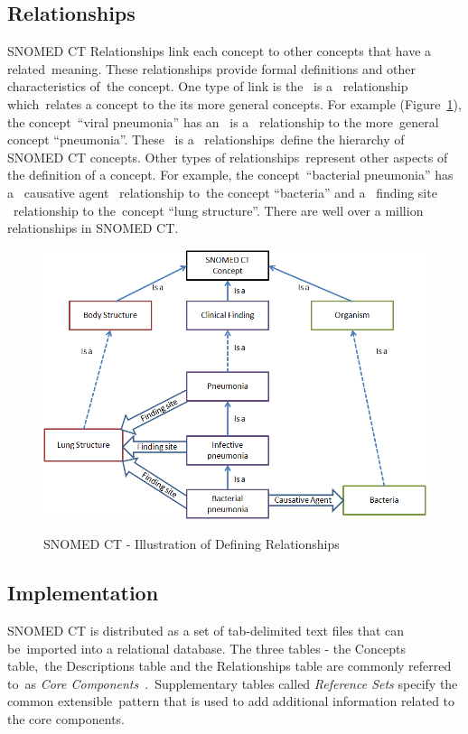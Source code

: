 \documentclass[DIV=calc, paper=a4, fontsize=12pt, onecolumn]{scrartcl}	 %
\begin{document}
  \subsection{Relationships}
  SNOMED CT Relationships link each concept to other concepts that have a related\
  meaning. These relationships provide formal definitions and other characteristics of\
  the concept. One type of link is the \textbar ~is a \textbar ~relationship which\
  relates a concept to the its more general concepts. For example (Figure~\ref{fig:snomedct_relationships}), the concept\
  ``viral pneumonia'' has an \textbar ~is a \textbar ~relationship to the more\
  general concept ``pneumonia''. These \textbar ~is a \textbar ~relationships\
  define the hierarchy of SNOMED CT concepts. Other types of relationships\
  represent other aspects of the definition of a concept. For example, the concept\
  ``bacterial pneumonia'' has a \textbar ~causative agent \textbar ~relationship to\
  the concept ``bacteria'' and a \textbar ~finding site \textbar ~relationship to the\
  concept ``lung structure''. There are well over a million relationships in SNOMED CT.
  \begin{figure}[!ht]
    \centering
    \includegraphics[scale=0.5]{defining_relationship_example1.png}
    \caption{SNOMED CT - Illustration of Defining Relationships}\citep[Fig.~7]{snomed_-_user_guide_snomed_2011}
    \label{fig:snomedct_relationships}
  \end{figure}

\subsection{Implementation}
  SNOMED CT is distributed as a set of tab-delimited text files that can be\
  imported into a relational database. The three tables - the Concepts table,\
  the Descriptions table and the Relationships table are commonly referred to\
  as \emph{Core Components}~\citep{snomed_implementation_guide_snomed_2011}.\
  Supplementary tables called \emph{Reference Sets} specify the common extensible\
  pattern that is used to add additional information related to the core components.
\end{document}
